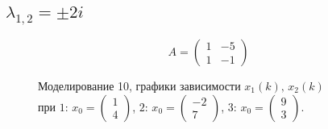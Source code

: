 \documentclass[a5paper, 10pt]{article}
\theoremstyle{definition}
\theoremstyle{plain}
\theoremstyle{remark}
\begin{document}
\subsection{$\lambda_{1, 2} = \pm 2i$}
\begin{equation}
A =
\begin{pmatrix}
1 &  -5  \\
1 & -1
\end{pmatrix}
\end{equation}
\begin{figure}[h!]
\caption{Моделирование 10, графики зависимости $x_1 \left( k \right), \, x_2 \left( k \right)$ \\ при  $1: \, x_0 = \begin{pmatrix} 1 \\ 4 \end{pmatrix}$, $2: \, x_0 = \begin{pmatrix} -2 \\ 7 \end{pmatrix}$, $3: \, x_0 = \begin{pmatrix} 9 \\ 3 \end{pmatrix}$.}
\end{figure}

\newpage
\end{document}
